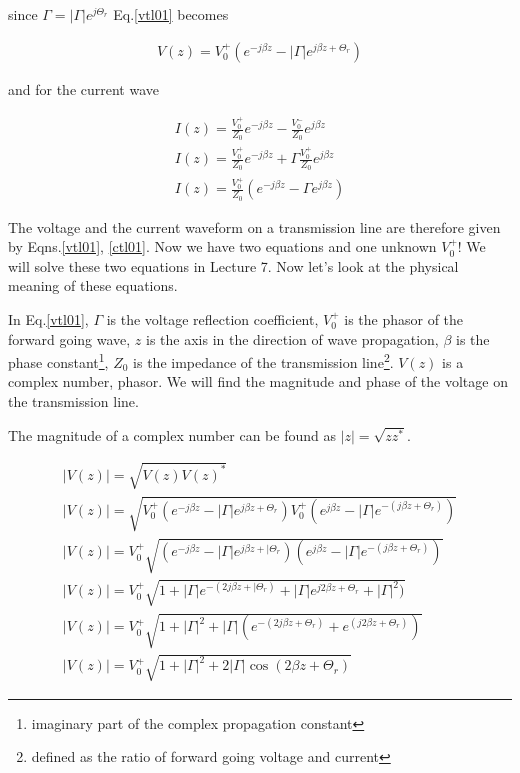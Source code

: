 \documentclass{ximera}
\begin{document}
since $\Gamma = |\Gamma| e^{j \Theta_r}$ Eq.\ref{vtl01} becomes


\begin{eqnarray}
V(z)= V_0^+ (e^{-j \beta z} - |\Gamma|  e^{j \beta z + \Theta_r}  ) \label{vtl011}
\end{eqnarray}



and for the current wave



\begin{eqnarray}
I(z) = \frac{V_0^+}{Z_0} e^{-j \beta z} -  \frac{V_0^-}{Z_0} e^{j \beta z} \label{ctl1}\\
I(z) =  \frac{V_0^+}{Z_0}  e^{-j \beta z} + \Gamma \frac{V_0^+}{Z_0}  e^{j \beta z} \nonumber
\\
I(z)=   \frac{V_0^+}{Z_0}  (e^{-j \beta z} - \Gamma  e^{j \beta z}  ) \label{ctl01}
\end{eqnarray}

The voltage and the current waveform on a transmission line are
therefore given by Eqns.\ref{vtl01}, \ref{ctl01}. Now we have two
equations and one unknown $V_0^+$! We will solve these two equations
in Lecture 7. Now let's look at the physical meaning of these
equations.


In Eq.\ref{vtl01}, $\Gamma$ is the voltage reflection coefficient,
$V_0^+$ is the phasor of the forward going wave, $z$ is the axis in
the direction of wave propagation, $\beta$ is the phase
constant\footnote{imaginary part of the complex propagation constant},
$Z_0$ is the impedance of the transmission line\footnote{defined as
the ratio of forward going voltage and current}. $V(z)$ is a complex
number, phasor. We will find the magnitude and phase of the voltage on
the transmission line.




The magnitude of a complex number can be found as $|z|=\sqrt{z
z^*}$.

\begin{eqnarray}
|V(z)|=\sqrt{V(z) V(z)^*} \nonumber  \\
|V(z)|=\sqrt{   V_0^+ (e^{-j \beta z} - |\Gamma|  e^{j \beta z +
 \Theta_r}  )  
   V_0^+ (e^{j \beta z} - |\Gamma|  e^{-(j \beta z + \Theta_r)}     )} \nonumber
\\
|V(z)|= V_0^+ \sqrt{(e^{-j \beta z} - |\Gamma|  e^{j \beta z +
|\Theta_r}  )  
  (e^{j \beta z} - |\Gamma|  e^{-(j \beta z + \Theta_r)}     )}
\nonumber \\
|V(z)|= V_0^+ \sqrt{1+  |\Gamma|  e^{-(2j \beta z +
|\Theta_r)}    + |\Gamma|  e^{j 2 \beta z + \Theta_r} +|\Gamma|^2     )}
\nonumber \\
|V(z)|= V_0^+ \sqrt{1+ |\Gamma|^2 + |\Gamma| ( e^{-(2j \beta z +
 \Theta_r)}   +  e^{(j 2 \beta z + \Theta_r)}     )}
 \nonumber \\
|V(z)|= V_0^+  \sqrt{1+ |\Gamma|^2 + 2 |\Gamma| \cos(2 \beta z +\Theta_r)} \label{sw1} 
\end{eqnarray}
\end{document}
